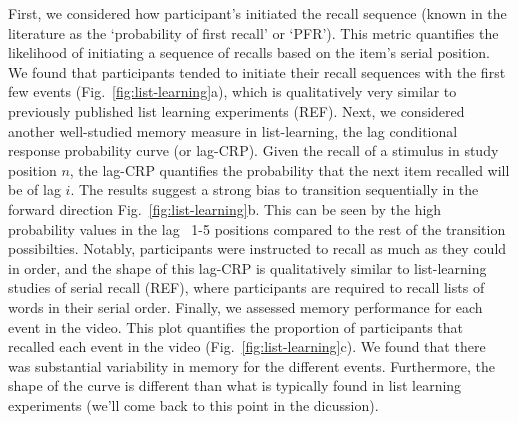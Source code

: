 \documentclass{article}
\begin{document}
{First, we considered how participant's initiated the recall sequence (known in the literature as the `probability of first recall' or `PFR'). This metric quantifies the likelihood of initiating a sequence of recalls based on the item's serial position. We found that participants tended to initiate their recall sequences with the first few events (Fig.~\ref{fig:list-learning}a), which is qualitatively very similar to previously published list learning experiments (REF).  Next, we considered another well-studied memory measure in list-learning, the lag conditional response probability curve (or lag-CRP). Given the recall of a stimulus in study position $n$, the lag-CRP quantifies the probability that the next item recalled will be of lag $i$. The results suggest a strong bias to transition sequentially in the forward direction Fig.~\ref{fig:list-learning}b. This can be seen by the high probability values in the lag ~1-5 positions compared to the rest of the transition possibilties. Notably, participants were instructed to recall as much as they could in order, and the shape of this lag-CRP is qualitatively similar to list-learning studies of serial recall (REF), where participants are required to recall lists of words in their serial order. Finally, we assessed memory performance for each event in the video. This plot quantifies the proportion of participants that recalled each event in the video (Fig.~\ref{fig:list-learning}c). We found that there was substantial variability in memory for the different events. Furthermore, the shape of the curve is different than what is typically found in list learning experiments (we'll come back to this point in the dicussion).

}
\end{document}
